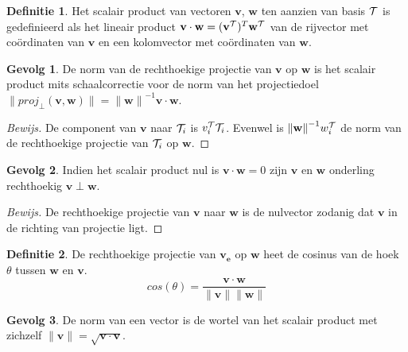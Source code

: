 \documentclass{amsart}
\theoremstyle{definition}
\newtheorem{dfn}{Definitie}[section]
\newtheorem{csq}{Gevolg}[section]
\newenvironment{bewijs}{\begin{proof}[Bewijs]}{\end{proof}}
\newcommand{\norm}[1]{\lVert{#1}\rVert}
\newcommand{\vvec}[1][v]{\mathbf{#1}}
\newcommand{\uvec}[1][v]{\vvec[#1]_\mathbf{e}}
\newcommand{\vnorm}[1]{\norm{\vvec[#1]}}
\newcommand{\vecrow}[1][a]{\mathcal{\MakeUppercase{#1}}}
\newcommand{\rvec}[2][i]{{#2}_{#1}}
\newcommand{\rvecr}[2][i]{\rvec[#1]{\vecrow[#2]}}
\newcommand{\cvec}[2]{{#1}^{#2}}
\newcommand{\cvecv}[2][v]{\cvec{\vvec[#1]}{#2}}
\newcommand{\cvecva}[1][a]{\cvecv{\vecrow[#1]}}
\newcommand{\cvecc}[2][a]{\cvecv[#2]{\vecrow[#1]}}
\newcommand{\vcord}[3]{{#1}_{#2}^{#3}}
\newcommand{\vcordv}[3][v]{\vcord{#1}{#2}{\vecrow[#3]}}
\newcommand{\vcordvi}[2][i]{\vcordv{#1}{#2}}
\begin{document}
\begin{dfn}
	Het scalair product van vectoren $\vvec$, $\vvec[w]$ ten aanzien van basis $\vecrow[t]$ is gedefinieerd als het lineair product $\vvec \cdot \vvec[w] = (\cvecva[t])^T \cvecc[t]{w}$ van de rijvector met coördinaten van $\vvec$ en een kolomvector met coördinaten van $\vvec[w]$.
\end{dfn}

\begin{csq}
	De norm van de rechthoekige projectie van $\vvec$ op $\vvec[w]$ is het scalair product mits schaalcorrectie voor de norm van het projectiedoel $\norm{proj_\perp(\vvec, \vvec[w])} = {\vnorm w}^{-1}\vvec \cdot \vvec[w]$.
	\begin{bewijs}
		De component van $\vvec$ naar $\rvecr{t}$ is $\vcordvi{t}\rvecr{t}$. Evenwel is ${\vnorm w}^{-1}\vcordv[w]{i}{t}$ de norm van de rechthoekige projectie van $\rvecr{t}$ op $\vvec[w]$.
	\end{bewijs}
\end{csq}

\begin{csq}
	Indien het scalair product nul is $\vvec \cdot\vvec[w] = 0$ zijn $\vvec$ en $\vvec[w]$ onderling rechthoekig $\vvec\perp\vvec[w]$.
	\begin{bewijs}
		De rechthoekige projectie van $\vvec$ naar $\vvec[w]$ is de nulvector zodanig dat $\vvec$ in de richting van projectie ligt.
	\end{bewijs}
\end{csq}

\begin{dfn}
	De rechthoekige projectie van $\uvec$ op $\vvec[w]$ heet de cosinus van de hoek $\theta$ tussen $\vvec[w]$ en $\vvec$.
	\begin{equation*}
		cos(\theta) = \frac{\vvec \cdot \vvec[w]}{\vnorm v\vnorm w}
	\end{equation*}
\end{dfn}

\begin{csq}
	De norm van een vector is de wortel van het scalair product met zichzelf $\vnorm v = \sqrt{\vvec\cdot\vvec}$.
\end{csq}

\newpage
\end{document}
